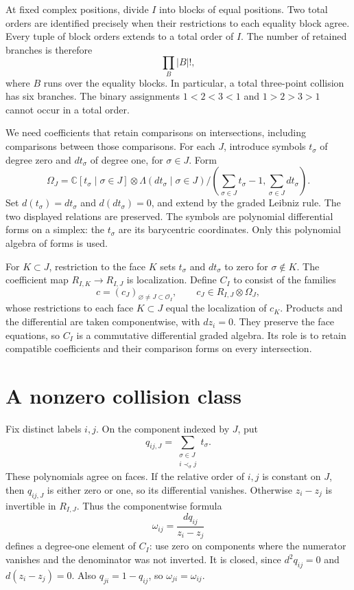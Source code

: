 At fixed complex positions, divide $I$ into blocks of equal positions.
Two total orders are identified precisely when their restrictions
to each equality block agree.
Every tuple of block orders extends to a total order of $I$.
The number of retained branches is therefore
\[
 \prod_B |B|!,
\]
where $B$ runs over the equality blocks.
In particular, a total three-point collision has six branches.
The binary assignments $1<2<3<1$ and $1>2>3>1$ cannot occur
in a total order.

We need coefficients that retain comparisons on intersections,
including comparisons between those comparisons.
For each $J$, introduce symbols $t_\sigma$ of degree zero and
$dt_\sigma$ of degree one, for $\sigma\in J$.
Form
\[
 \Omega_J=
 \mathbb C[t_\sigma\mid\sigma\in J]
 \otimes\Lambda(dt_\sigma\mid\sigma\in J)
 \big/\left(\sum_{\sigma\in J}t_\sigma-1,
             \sum_{\sigma\in J}dt_\sigma\right).
\]
Set $d(t_\sigma)=dt_\sigma$ and $d(dt_\sigma)=0$, and extend by
the graded Leibniz rule. The two displayed relations are preserved.
The symbols are polynomial differential forms on a simplex:
the $t_\sigma$ are its barycentric coordinates.
Only this polynomial algebra of forms is used.

For $K\subset J$, restriction to the face $K$ sets $t_\sigma$ and
$dt_\sigma$ to zero for $\sigma\notin K$.
The coefficient map $R_{I,K}\to R_{I,J}$ is localization.
Define $C_I$ to consist of the families
\[
 c=(c_J)_{\varnothing\ne J\subset\mathcal O_I},
 \qquad c_J\in R_{I,J}\otimes\Omega_J,
\]
whose restrictions to each face $K\subset J$ equal the localization
of $c_K$.
Products and the differential are taken componentwise, with
$dz_i=0$.
They preserve the face equations, so $C_I$ is a commutative
differential graded algebra.
Its role is to retain compatible coefficients and their comparison
forms on every intersection.

\section{A nonzero collision class}

Fix distinct labels $i,j$. On the component indexed by $J$, put
\[
 q_{ij,J}=\sum_{\substack{\sigma\in J\\i\prec_\sigma j}}t_\sigma.
\]
These polynomials agree on faces.
If the relative order of $i,j$ is constant on $J$, then
$q_{ij,J}$ is either zero or one, so its differential vanishes.
Otherwise $z_i-z_j$ is invertible in $R_{I,J}$.
Thus the componentwise formula
\[
 \omega_{ij}=\frac{dq_{ij}}{z_i-z_j}
\]
defines a degree-one element of $C_I$: use zero on components where
the numerator vanishes and the denominator was not inverted.
It is closed, since $d^2q_{ij}=0$ and $d(z_i-z_j)=0$.
Also $q_{ji}=1-q_{ij}$, so $\omega_{ji}=\omega_{ij}$.

